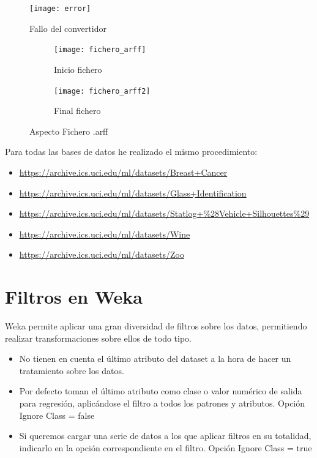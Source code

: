 \begin{figure}[H]
    \centering
    \texttt{[image: error]}
    \caption{Fallo del convertidor}
    \label{fig:fallo}
\end{figure}

\begin{figure}[H]
	\begin{subfigure}[H]{0.48\textwidth}
    	\texttt{[image: fichero\_arff]}	
    	\caption{Inicio fichero}
    	\label{fig:datos}
	\end{subfigure}
	\hfill
	\begin{subfigure}[H]{0.48\textwidth}
    	\texttt{[image: fichero\_arff2]}	
    	\caption{Final fichero}
    	\label{fig:atributos}
	\end{subfigure}
	\caption{Aspecto Fichero .arff}
	\label{fig:fichero_arff}
\end{figure}

Para todas las bases de datos he realizado el mismo procedimiento:
\begin{itemize}
\item \url{https://archive.ics.uci.edu/ml/datasets/Breast+Cancer}
\item \url{https://archive.ics.uci.edu/ml/datasets/Glass+Identification}
\item \url{https://archive.ics.uci.edu/ml/datasets/Statlog+%28Vehicle+Silhouettes%29}
\item \url{https://archive.ics.uci.edu/ml/datasets/Wine}
\item \url{https://archive.ics.uci.edu/ml/datasets/Zoo}
\end{itemize}

\newpage
\section{Filtros en Weka}

Weka permite aplicar una gran diversidad de filtros sobre los datos, permitiendo realizar transformaciones sobre ellos de todo tipo.

\begin{itemize}
	\item No tienen en cuenta el último atributo del dataset a la hora de hacer un tratamiento sobre los datos.
	\item Por defecto toman el último atributo como clase o valor numérico de salida para regresión, aplicándose el filtro a todos los patrones y atributos.
	\subitem Opción Ignore Class = false
	\item Si queremos cargar una serie de datos a los que aplicar filtros en su totalidad, indicarlo en la opción correspondiente en el filtro.
	\subitem Opción Ignore Class = true
\end{itemize}


